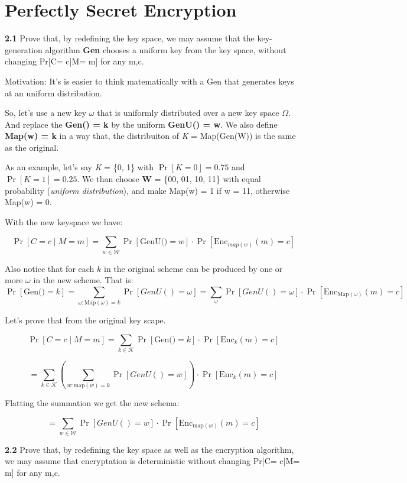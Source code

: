 \chapter{Perfectly Secret Encryption}

\noindent
\textbf{2.1} \hspace{1em} Prove that, by redefining the key space, we may assume that the key-generation algorithm \textbf{Gen} chooses a uniform key from the key space, without changing Pr[C= c|M= m] for any m,c.
\vspace{1em}

Motivation: It's is easier to think matematically with a Gen that generates keys at an uniform distribution.

So, let's use a new key $\omega$ that is uniformly distributed over a new key space $\Omega$. And replace the \textbf{Gen() = k}  by the uniform \textbf{GenU() = w}. We also define \textbf{Map(w) = k} in a way that, the distribuiton of \textit{K}  = Map(Gen(W)) is the same as the original.

As an example, let's say \textit{K} = \{0, 1\} with $\Pr[K = 0] = 0.75$ and $\Pr[K = 1] =  0.25$. We than choose \textbf{W} = \{00, 01, 10, 11\} with equal probability (\textit{uniform distribution}), and make Map(w) = 1 if w = 11, otherwise Map(w) = 0.

With the new keyspace we have:

\[
\Pr[C = c \mid M = m] = \sum_{w \in \mathcal{W}} \Pr[\text{GenU()} = w] \cdot \Pr[\text{Enc}_{map(w)}(m) = c]
\]

Also notice that for each \( k \) in the original scheme can be produced by one or more \( \omega \) in the new scheme. That is:
\[
\Pr[\text{Gen()} = k] = \sum_{\omega : \text{Map}(\omega) = k} \Pr[GenU() = \omega] = \sum_{\omega} \Pr[GenU() = \omega] \cdot \Pr[\text{Enc}_{\text{Map}(\omega)}(m) = c]
\]


Let's prove that from the original key scape.

\[
\Pr[C = c \mid M = m] = \sum_{k \in \mathcal{K}} \Pr[\text{Gen()} = k] \cdot \Pr[\text{Enc}_k(m) = c]
\]

\[
 = \sum_{k \in \mathcal{K}} \left( \sum_{w : \text{map}(w) = k} \Pr[GenU() = w] \right) \cdot \Pr[\text{Enc}_k(m) = c]
\]

Flatting the summation we get the new schema:

\[
= \sum_{w \in \mathcal{W}} \Pr[GenU() = w] \cdot \Pr[\text{Enc}_{\text{map}(w)}(m) = c]
\]

\vspace{1em}
\noindent
\textbf{2.2} \hspace{1em} Prove that, by redefining the key space as well as the encryption algorithm, we may assume that encryptation is deterministic without changing Pr[C= c|M= m] for any m,c.
\vspace{1em}

